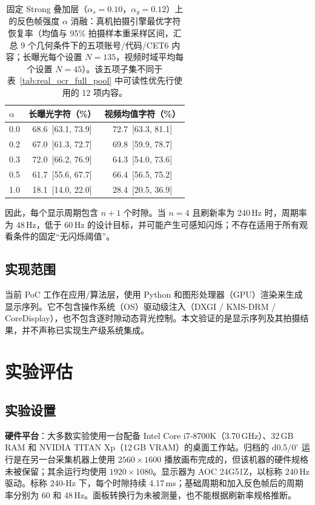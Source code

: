 \documentclass{ieeeaccess}
\begin{document}
\begin{table}[!t]
\caption{固定 Strong 叠加层（$\alpha_s=0.10$，$\alpha_g=0.12$）上的反色帧强度 $\alpha$ 消融：真机拍摄引擎最优字符恢复率（均值与 95\% 拍摄样本重采样区间，汇总 9 个几何条件下的五项账号/代码/CET6 内容；长曝光每个设置 $N=135$，视频时域平均每个设置 $N=45$）。该五项子集不同于表~\ref{tab:real_ocr_full_pool} 中可读性优先行使用的 12 项内容。}
\label{tab:inversion_ablation}
\centering
\footnotesize
\begin{tabular}{lcc}
\toprule
$\alpha$ & 长曝光字符（\%） & 视频均值字符（\%） \\
\midrule
0.0 & 68.6~[63.1, 73.9] & 72.7~[63.3, 81.1] \\
0.2 & 67.0~[61.3, 72.7] & 69.8~[59.9, 78.7] \\
0.3 & 72.0~[66.2, 76.9] & 64.3~[54.0, 73.6] \\
0.5 & 61.7~[55.6, 67.7] & 66.4~[56.5, 75.2] \\
1.0 & 18.1~[14.0, 22.0] & 28.4~[20.5, 36.9] \\
\bottomrule
\end{tabular}
\end{table}

因此，每个显示周期包含 $n+1$ 个时隙。当 $n=4$ 且刷新率为 240\,Hz 时，周期率为 48\,Hz，低于 60\,Hz 的设计目标，并可能产生可感知闪烁；不存在适用于所有观看条件的固定“无闪烁阈值”。

\subsection{实现范围}

当前 PoC 工作在应用/算法层，使用 Python 和图形处理器（GPU）渲染来生成显示序列。它不包含操作系统（OS）驱动级注入（DXGI / KMS-DRM / CoreDisplay），也不包含逐时隙动态背光控制。本文验证的是显示序列及其拍摄结果，并不声称已实现生产级系统集成。


\section{实验评估}
\label{sec:evaluation}

\subsection{实验设置}
\label{sec:setup}

\textbf{硬件平台}：大多数实验使用一台配备 Intel Core i7-8700K（3.70\,GHz）、32\,GB RAM 和 NVIDIA TITAN Xp（12\,GB VRAM）的桌面工作站。归档的 d0.5/$0^{\circ}$ 运行是在另一台采集机器上使用 $2560\times1600$ 播放画布完成的，但该机器的硬件规格未被保留；其余运行均使用 $1920\times1080$。显示器为 AOC 24G51Z，以标称 240\,Hz 驱动。标称 240-Hz 下，每个时隙持续 4.17\,ms；基础周期和加入反色帧后的周期率分别为 60 和 48\,Hz。面板转换行为未被测量，也不能根据刷新率规格推断。
\end{document}
